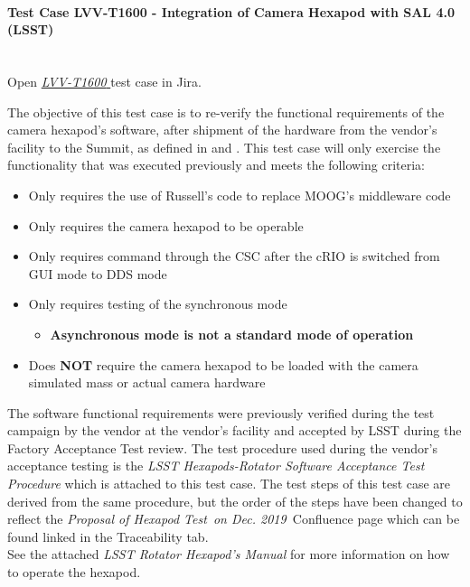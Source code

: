 \documentclass[SE,lsstdraft,STR,toc]{lsstdoc}
\providecommand{\tightlist}{
  \setlength{\itemsep}{0pt}\setlength{\parskip}{0pt}}
\begin{document}
\paragraph{Test Case LVV-T1600 - Integration of Camera Hexapod with SAL 4.0 (LSST) }\mbox{}\\

Open  \href{https://jira.lsstcorp.org/secure/Tests.jspa#/testCase/LVV-T1600}{\textit{ LVV-T1600 } }
test case in Jira.

The objective of this test case is to re-verify the functional
requirements of the camera hexapod's software, after shipment of the
hardware from the vendor's facility to the Summit, as defined in 
and . This test case will only exercise the functionality that
was executed previously and meets the following criteria:

\begin{itemize}
\tightlist
\item
  Only requires the use of Russell's code to replace MOOG's middleware
  code
\item
  Only requires the camera hexapod to be operable
\item
  Only requires command through the CSC after the cRIO is switched from
  GUI mode to DDS mode
\item
  Only requires testing of the synchronous mode

  \begin{itemize}
  \tightlist
  \item
    \textbf{Asynchronous mode is not a standard mode of operation}
  \end{itemize}
\item
  Does \textbf{NOT} require the camera hexapod to be loaded with the
  camera simulated mass or actual camera hardware
\end{itemize}

The software functional requirements were previously verified during the
test campaign by the vendor at the vendor's facility and accepted by
LSST during the Factory Acceptance Test review. The test procedure used
during the vendor's acceptance testing is the \emph{LSST
Hexapods-Rotator Software Acceptance Test Procedure} which is attached
to this test case. The test steps of this test case are derived from the
same procedure, but the order of the steps have been changed to reflect
the \emph{Proposal of Hexapod Test~on Dec. 2019~}Confluence page which
can be found linked in the Traceability tab.\\[2\baselineskip]See the
attached \emph{LSST Rotator Hexapod's Manual} for more information on
how to operate the hexapod.
\end{document}

